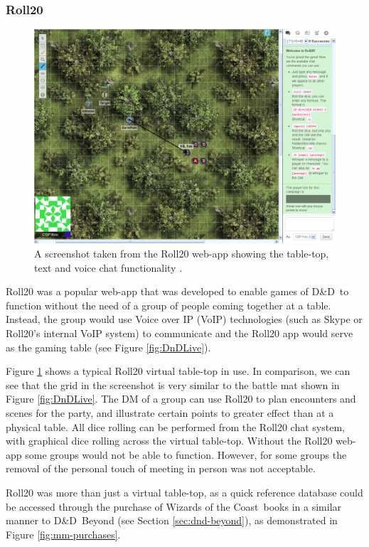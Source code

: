 \documentclass[final]{cmpreport}
\newcommand{\WotC}{Wizards of the Coast}
\newcommand{\dnd}{D\&D}
\begin{document}
			\subsubsection{Roll20} \label{sec:roll20}
			\begin{figure}[h]
				\centering
				\includegraphics[width=0.75\linewidth]{roll20-example.jpg}
				\caption[Roll20 Screenshot]{A screenshot taken from the Roll20 web-app showing the table-top, text and voice chat functionality \citep{roll20-example}.} \label{fig:roll20}
			\end{figure}
		
			Roll20 \citep{roll20} was a popular web-app that was developed to enable games of \dnd \ to function without the need of a group of people coming together at a table. Instead, the group would use Voice over IP (VoIP) technologies (such as Skype or Roll20's internal VoIP system) to communicate and the Roll20 app would serve as the gaming table (see Figure \ref{fig:DnDLive}). 			
			
			Figure \ref{fig:roll20} shows a typical Roll20 virtual table-top in use. In comparison, we can see that the grid in the screenshot is very similar to the battle mat shown in Figure \ref{fig:DnDLive}. The DM of a group can use Roll20 to plan encounters and scenes for the party, and illustrate certain points to greater effect than at a physical table. All dice rolling can be performed from the Roll20 chat system, with graphical dice rolling across the virtual table-top. Without the Roll20 web-app some groups would not be able to function. However, for some groups the removal of the personal touch of meeting in person was not acceptable. 
					
			Roll20 was more than just a virtual table-top, as a quick reference database could be accessed through the purchase of \WotC \ books in a similar manner to \dnd \ Beyond (see Section \ref{sec:dnd-beyond}), as demonstrated in Figure \ref{fig:mm-purchases}. 
			
\end{document}
